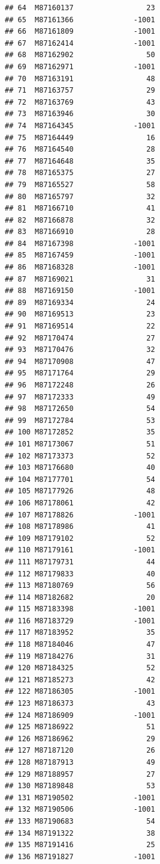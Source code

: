 \documentclass[
  man]{apa6}
\begin{document}
\begin{verbatim}
## 64  M87160137                 23
## 65  M87161366              -1001
## 66  M87161809              -1001
## 67  M87162414              -1001
## 68  M87162902                 50
## 69  M87162971              -1001
## 70  M87163191                 48
## 71  M87163757                 29
## 72  M87163769                 43
## 73  M87163946                 30
## 74  M87164345              -1001
## 75  M87164449                 16
## 76  M87164540                 28
## 77  M87164648                 35
## 78  M87165375                 27
## 79  M87165527                 58
## 80  M87165797                 32
## 81  M87166710                 41
## 82  M87166878                 32
## 83  M87166910                 28
## 84  M87167398              -1001
## 85  M87167459              -1001
## 86  M87168328              -1001
## 87  M87169021                 31
## 88  M87169150              -1001
## 89  M87169334                 24
## 90  M87169513                 23
## 91  M87169514                 22
## 92  M87170474                 27
## 93  M87170476                 32
## 94  M87170908                 47
## 95  M87171764                 29
## 96  M87172248                 26
## 97  M87172333                 49
## 98  M87172650                 54
## 99  M87172784                 53
## 100 M87172852                 35
## 101 M87173067                 51
## 102 M87173373                 52
## 103 M87176680                 40
## 104 M87177701                 54
## 105 M87177926                 48
## 106 M87178061                 42
## 107 M87178826              -1001
## 108 M87178986                 41
## 109 M87179102                 52
## 110 M87179161              -1001
## 111 M87179731                 44
## 112 M87179833                 40
## 113 M87180769                 56
## 114 M87182682                 20
## 115 M87183398              -1001
## 116 M87183729              -1001
## 117 M87183952                 35
## 118 M87184046                 47
## 119 M87184276                 31
## 120 M87184325                 52
## 121 M87185273                 42
## 122 M87186305              -1001
## 123 M87186373                 43
## 124 M87186909              -1001
## 125 M87186922                 51
## 126 M87186962                 29
## 127 M87187120                 26
## 128 M87187913                 49
## 129 M87188957                 27
## 130 M87189848                 53
## 131 M87190502              -1001
## 132 M87190506              -1001
## 133 M87190683                 54
## 134 M87191322                 38
## 135 M87191416                 25
## 136 M87191827              -1001

\end{verbatim}
\end{document}
